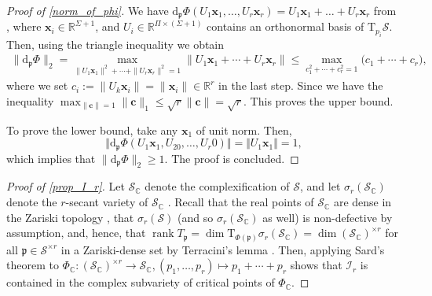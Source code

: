 \documentclass[a4paper,10pt,final]{siamart1116}
\newcommand{\tuple}[1]{\mathfrak{#1}}
\newcommand{\Var}[1]{\mathcal{#1}}
\newcommand{\vect}[1]{\mathbf{#1}}
\newcommand{\Tang}[2]{\mathrm{T}_{#1} {#2}}
\newcommand{\deriv}[2]{\mathrm{d}_{#1}#2}
\newcommand{\C}{\mathbb{C}}
\newcommand{\R}{\mathbb{R}}
\newcommand{\reflem}[1]{\cref{#1}}
\numberwithin{equation}{section}
\numberwithin{figure}{section}
\numberwithin{table}{section}
\numberwithin{theorem}{section}
\begin{document}
\begin{proof}[Proof of \reflem{norm_of_phi}]
We have $\deriv{\tuple{p}}{\Phi}(U_1{\vect{x}}_1, \ldots, U_r {\vect{x}}_r) = U_1 {\vect{x}}_1 + \ldots + U_r {\vect{x}}_r$ from \cite{BV2017}, where ${\vect{x}}_i \in \R^{\Sigma+1}$, and $U_i \in \R^{\Pi \times (\Sigma+1)}$ contains an orthonormal basis of $\Tang{p_i}{\Var{S}}$. Then, using the triangle inequality we obtain
\begin{align*}
 \|\deriv{\tuple{p}}{\Phi}\|_2
 = \max_{\|U_1 {\vect{x}}_1\|^2 + \cdots + \|U_r {\vect{x}}_r\|^2 = 1} \|U_1 {\vect{x}}_1 + \cdots + U_r {\vect{x}}_r\|
 \le \max_{c_1^2 + \cdots + c_r^2 = 1} \bigl( c_1 + \cdots + c_r \bigr),
\end{align*}
where we set $c_i := \|U_k \vect{x}_i \| = \|{\vect{x}}_i\| \in \R^r$ in the last step. Since we have the inequality $\max_{\|\vect{c}\|=1} \|\vect{c}\|_1 \le \sqrt{r} \|\vect{c}\| = \sqrt{r}.$ This proves the upper bound.

To prove the lower bound, take any $\vect{x}_1$ of unit norm. Then,
$$\Vert\deriv{\tuple{p}}{\Phi}(U_1{\vect{x}}_1, U_20, \ldots, U_r 0)\Vert = \Vert U_1\vect{x}_1\Vert = 1,$$
which implies that $\|\deriv{\tuple{p}}{\Phi}\|_2 \geq 1$. The proof is concluded.
\end{proof}

\begin{proof}[Proof of \reflem{prop_I_r}]
Let $\Var{S}_{\C}$ denote the complexification of $\Var{S}$, and let $\sigma_r(\Var{S}_{\C})$ denote the $r$-secant variety of $\Var{S}_{\C}$ \cite{Harris1992}.
Recall that the real points of $\mathcal{S}_\C$ are dense in the Zariski topology \cite[section 5]{QCL2016}, that $\sigma_r(\mathcal{S})$ (and so $\sigma_r(\mathcal{S}_\C)$ as well) is non-defective by assumption, and, hence, that $\operatorname{rank} T_{\tuple{p}} = \dim \mathrm{T}_{\Phi(\tuple{p})} \sigma_r(\mathcal{S}_\C) = \dim (\Var{S}_\C)^{\times r}$ for all $\tuple{p}\in\Var{S}^{\times r}$ in a Zariski-dense set by Terracini's lemma \cite{Landsberg2012}.
Then, applying Sard's theorem \cite{Harris1992} to $\Phi_\C : (\Var{S}_{\C})^{\times r} \to \Var{S}_{\C}, (p_1,\ldots,p_r) \mapsto p_1 + \cdots + p_r$ shows that $\mathcal{I}_r$ is contained in the complex subvariety of critical points of $\Phi_\C$.
\end{proof}
\end{document}
